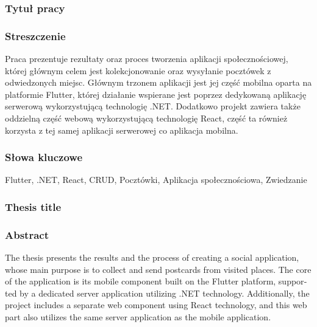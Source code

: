 \documentclass[a4paper,twoside,12pt]{book}
\begin{document}


\cleardoublepage

\rmfamily\normalfont
\pagestyle{empty}



\subsubsection*{Tytuł pracy} 
\Title

\subsubsection*{Streszczenie}  
Praca prezentuje rezultaty oraz proces tworzenia aplikacji społecznościowej, której głównym celem jest kolekcjonowanie oraz wysyłanie pocztówek z odwiedzonych miejsc. Głównym trzonem aplikacji jest jej część mobilna oparta na platformie Flutter, której działanie wspierane jest poprzez dedykowaną aplikację serwerową wykorzystującą technologię .NET. Dodatkowo projekt zawiera także oddzielną część webową wykorzystującą technologię React, część ta również korzysta z tej samej aplikacji serwerowej co aplikacja mobilna.

\subsubsection*{Słowa kluczowe} 
Flutter, .NET, React, CRUD, Pocztówki, Aplikacja społecznościowa, Zwiedzanie

\subsubsection*{Thesis title} 
\begin{otherlanguage}{british}
\TitleAlt
\end{otherlanguage}

\subsubsection*{Abstract} 
\begin{otherlanguage}{british}
The thesis presents the results and the process of creating a social application, whose main purpose is to collect and send postcards from visited places. The core of the application is its mobile component built on the Flutter platform, supported by a dedicated server application utilizing .NET technology. Additionally, the project includes a separate web component using React technology, and this web part also utilizes the same server application as the mobile application.
\end{otherlanguage}
\end{document}
